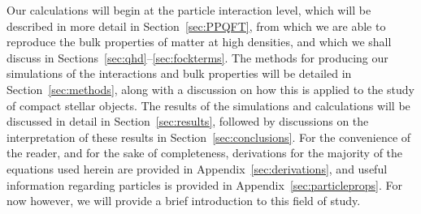 \documentclass[11pt,a4paper,twoside]{carrollthesis}
\begin{document}
\par
%
Our calculations will begin at the particle interaction level, which
will be described in more detail in Section~\ref{sec:PPQFT}, from
which we are able to reproduce the bulk properties of matter at high
densities, and which we shall discuss in
Sections~\ref{sec:qhd}--\ref{sec:fockterms}. The methods for producing
our simulations of the interactions and bulk properties will be
detailed in Section~\ref{sec:methods}, along with a discussion on how
this is applied to the study of compact stellar objects. The results
of the simulations and calculations will be discussed in detail in
Section~\ref{sec:results}, followed by discussions on the
interpretation of these results in Section~\ref{sec:conclusions}. For
the convenience of the reader, and for the sake of completeness,
derivations for the majority of the equations used herein are provided
in Appendix~\ref{sec:derivations}, and useful information regarding
particles is provided in Appendix~\ref{sec:particleprops}. For now
however, we will provide a brief introduction to this field of
study.\par
\end{document}
